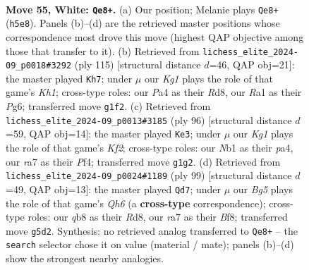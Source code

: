 \documentclass[11pt]{article}
\begin{document}
\clearpage

\begin{figure}[p]\centering
\begin{subfigure}{0.46\textwidth}\centering
\resizebox{\linewidth}{!}{%
\newchessgame
\chessboard[
  setfen={1qb5/r7/4k3/p2p1pBQ/P6P/8/8/RN4K1 w - - 0 55},
  showmover=false,
  pgfstyle=straightmove, color=movearrow, markmove={h5-e8}
]}
\caption{}
\end{subfigure}\hfill
\begin{subfigure}{0.46\textwidth}\centering
\resizebox{\linewidth}{!}{%
\newchessgame
\chessboard[
  setfen={3r3k/8/3q2p1/7p/Pp6/1P3Q1P/K1R5/8 b - - 0 58},
  showmover=false,
  pgfstyle=straightmove, color=movearrow, markmove={h8-h7}
]}
\caption{}
\end{subfigure}
\\[4pt]
\begin{subfigure}{0.46\textwidth}\centering
\resizebox{\linewidth}{!}{%
\newchessgame
\chessboard[
  setfen={R5B1/2kb4/3r3p/5p1P/pp3P2/6P1/5K2/8 w - - 0 49},
  showmover=false,
  pgfstyle=straightmove, color=movearrow, markmove={f2-e3}
]}
\caption{}
\end{subfigure}\hfill
\begin{subfigure}{0.46\textwidth}\centering
\resizebox{\linewidth}{!}{%
\newchessgame
\chessboard[
  setfen={3r1b1k/8/6pp/3N4/2Q5/1P4Pq/5P2/4R1K1 b - - 0 50},
  showmover=false,
  pgfstyle=straightmove, color=movearrow, markmove={h3-d7}
]}
\caption{}
\end{subfigure}
\caption{\textbf{Move 55, White: \texttt{Qe8+}.} (a) Our position; Melanie plays \texttt{Qe8+} (\texttt{h5e8}). Panels (b)--(d) are the retrieved master positions whose correspondence most drove this move (highest QAP objective among those that transfer to it). (b) Retrieved from \texttt{lichess\_elite\_2024-09\_p0018\#3292} (ply 115) [structural distance $d$=46, QAP obj=21]: the master played \texttt{Kh7}; under $\mu$ our \emph{Kg1} plays the role of that game's \emph{Kh1}; cross-type roles: our \emph{P}a4 as their \emph{R}d8, our \emph{R}a1 as their \emph{P}g6; transferred move \texttt{g1f2}. (c) Retrieved from \texttt{lichess\_elite\_2024-09\_p0013\#3185} (ply 96) [structural distance $d$=59, QAP obj=14]: the master played \texttt{Ke3}; under $\mu$ our \emph{Kg1} plays the role of that game's \emph{Kf2}; cross-type roles: our \emph{N}b1 as their \emph{p}a4, our \emph{r}a7 as their \emph{P}f4; transferred move \texttt{g1g2}. (d) Retrieved from \texttt{lichess\_elite\_2024-09\_p0024\#1189} (ply 99) [structural distance $d$=49, QAP obj=13]: the master played \texttt{Qd7}; under $\mu$ our \emph{Bg5} plays the role of that game's \emph{Qh6} (a \textbf{cross-type} correspondence); cross-type roles: our \emph{q}b8 as their \emph{R}d8, our \emph{r}a7 as their \emph{B}f8; transferred move \texttt{g5d2}. Synthesis: no retrieved analog transferred to \texttt{Qe8+} -- the \texttt{search} selector chose it on value (material / mate); panels (b)--(d) show the strongest nearby analogies.}
\label{fig:thought-m108}
\end{figure}
\end{document}
